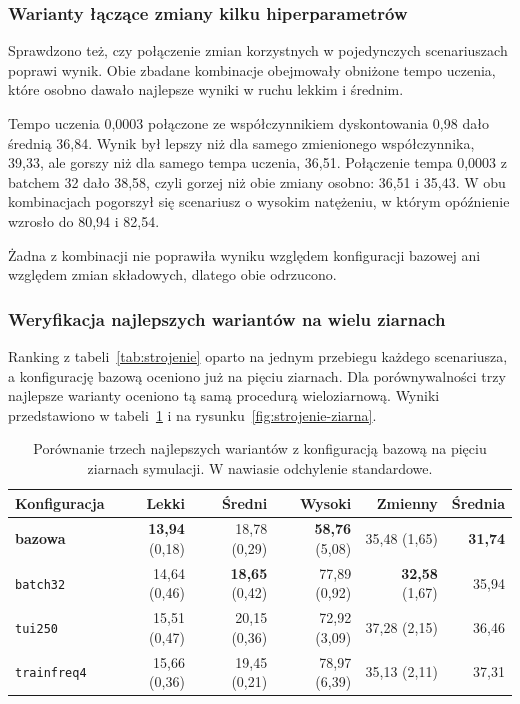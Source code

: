 \subsubsection{Warianty łączące zmiany kilku hiperparametrów}
\label{subsubsec:warianty-laczone}

Sprawdzono też, czy połączenie zmian korzystnych w pojedynczych scenariuszach poprawi wynik. Obie zbadane kombinacje obejmowały obniżone tempo uczenia, które osobno dawało najlepsze wyniki w ruchu lekkim i średnim.

Tempo uczenia 0,0003 połączone ze współczynnikiem dyskontowania 0,98 dało średnią 36,84. Wynik był lepszy niż dla samego zmienionego współczynnika, 39,33, ale gorszy niż dla samego tempa uczenia, 36,51. Połączenie tempa 0,0003 z batchem 32 dało 38,58, czyli gorzej niż obie zmiany osobno: 36,51 i 35,43. W obu kombinacjach pogorszył się scenariusz o wysokim natężeniu, w którym opóźnienie wzrosło do 80,94 i 82,54.

Żadna z kombinacji nie poprawiła wyniku względem konfiguracji bazowej ani względem zmian składowych, dlatego obie odrzucono.

\subsubsection{Weryfikacja najlepszych wariantów na wielu ziarnach}
\label{subsubsec:strojenie-ziarna}

Ranking z tabeli~\ref{tab:strojenie} oparto na jednym przebiegu każdego scenariusza, a konfigurację bazową oceniono już na pięciu ziarnach. Dla porównywalności trzy najlepsze warianty oceniono tą samą procedurą wieloziarnową. Wyniki przedstawiono w tabeli~\ref{tab:strojenie-ziarna} i na rysunku~\ref{fig:strojenie-ziarna}.

\begin{table}[htbp] \centering
    \caption[Walidacja najlepszych wariantów hiperparametrów.]{Porównanie trzech najlepszych wariantów z konfiguracją bazową na pięciu ziarnach symulacji. W nawiasie odchylenie standardowe.}
    \label{tab:strojenie-ziarna}
    \small
    \begin{tabular}{| l | r | r | r | r | r |} \hline
        Konfiguracja & Lekki & Średni & Wysoki & Zmienny & Średnia \\ \hline\hline
        \textbf{bazowa} & \textbf{13,94} (0,18) & 18,78 (0,29) & \textbf{58,76} (5,08) & 35,48 (1,65) & \textbf{31,74} \\ \hline
        \texttt{batch32}    & 14,64 (0,46) & \textbf{18,65} (0,42) & 77,89 (0,92) & \textbf{32,58} (1,67) & 35,94 \\ \hline
        \texttt{tui250}     & 15,51 (0,47) & 20,15 (0,36) & 72,92 (3,09) & 37,28 (2,15) & 36,46 \\ \hline
        \texttt{trainfreq4} & 15,66 (0,36) & 19,45 (0,21) & 78,97 (6,39) & 35,13 (2,11) & 37,31 \\ \hline
    \end{tabular}
\end{table}


